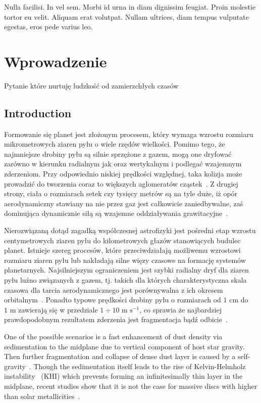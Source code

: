 \begin{savequote}[75mm]
Nulla facilisi. In vel sem. Morbi id urna in diam dignissim feugiat. Proin molestie tortor eu velit. Aliquam erat volutpat. Nullam ultrices, diam tempus vulputate egestas, eros pede varius leo.
\end{savequote}

\chapter{Wprowadzenie}

 Pytanie które nurtuję ludzkość od
zamierzchłych czasów 

\section{Introduction}

Formowanie się planet jest złożonym procesem, który wymaga wzrostu rozmiaru
mikrometrowych ziaren pyłu o wiele rzędów wielkości. Pomimo tego, że najmniejsze
drobiny pyłu są silnie sprzężone z gazem, mogą one dryfować zarówno w kierunku
radialnym jak oraz wertykalnym i podlegać wzajemnym zderzeniom. Przy odpowiednio
niskiej prędkości względnej, taka kolizja może prowadzić do tworzenia coraz to
większych aglomeratów cząstek~\citep{BW08}. Z drugiej strony, ciała o rozmiarach
setek czy tysięcy metrów są na tyle duże, iż opór aerodynamiczny stawiany na nie
przez gaz jest całkowicie zaniedbywalne, zaś dominująca dynamicznie siłą są
wzajemne oddziaływania grawitacyjne~\citep{KKI06}.

\par Nierozwiązaną dotąd zagadką współczesnej astrofizyki jest pośredni etap
wzrostu centymetrowych ziaren pyłu do kilometrowych głazów stanowiących budulec
planet. Istnieje szereg procesów, które przeciwdziałają możliwemu wzrostowi
rozmiaru ziaren pyłu lub nakładają silne więzy czasowe na formację systemów
planetarnych. Najsilniejszym ograniczeniem jest szybki radialny dryf dla ziaren
pyłu luźno związanych z gazem, tj. takich dla których charakterystyczna skala
czasowa dla tarcia aerodynamicznego jest porównywalna z ich okresem
orbitalnym~\citep{W77}. Ponadto typowe prędkości drobiny pyłu o rozmiarach od
$1\textrm{ cm}$ do $1\textrm{ m}$ zawierają się w przedziale $1\div10\textrm{ m
s}^{-1}$, co sprawia że najbardziej prawdopodobnym rezultatem zderzenia jest
fragmentacja bądź odbicie~\citep{Z10}.

\par One of the possible scenarios  is a fast enhancement
of dust density via sedimentation to the midplane due to vertical component of
host star gravity. Then further fragmentation and collapse of dense dust layer
is caused by a self-gravity~\citep{GW73}. Though the sedimentation itself leads
to the rise of Kelvin-Helmholz instability~\citep{JHK06} (KHI) which prevents
forming an infinitesimally thin layer in the midplane, recent studies show that
it is not the case for massive discs with higher than solar
metallicities~\citep{L10}.

